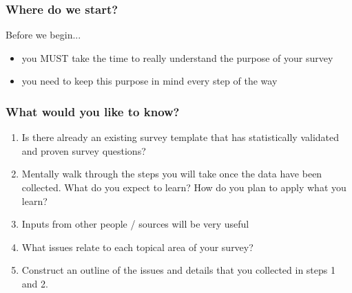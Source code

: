 \documentclass[10pt, compress]{beamer}
\begin{document}
\begin{frame}
    \frametitle{Where do we start?}
    \begin{block}{Before we begin...}
        \begin{itemize}
            \item you \alert{MUST} take the time to really understand the purpose of your survey
            \item you need to keep this purpose in mind every step of the way
        \end{itemize}
    \end{block}
\end{frame}

\begin{frame}
    \frametitle{What would you like to know?}
    \begin{enumerate}
        \item Is there already an existing survey template that has statistically validated and proven survey questions?
        \item Mentally walk through the steps you will take once the data have been collected. What do you expect to learn? How do you plan to apply what you learn?
        \item Inputs from other people / sources will be very useful
        \item What issues relate to each topical area of your survey?
        \item Construct an outline of the issues and details that you collected in steps 1 and 2.
    \end{enumerate}
\end{frame}
\end{document}
